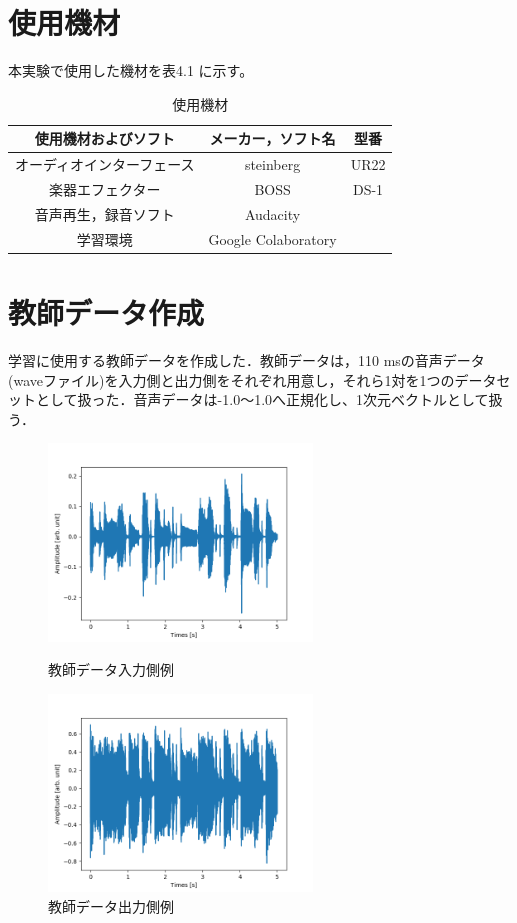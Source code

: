 \documentclass{jreport}		%
\begin{document}
\section{使用機材}
本実験で使用した機材を表4.1 に示す。
\begin{table}[h]
  \begin{center}
  \caption{使用機材}
  \begin{tabular}{c|cc} \hline
使用機材およびソフト&メーカー，ソフト名&型番 \\ \hline
    オーディオインターフェース&steinberg&UR22 \\
    楽器エフェクター&BOSS&DS-1\\
    音声再生，録音ソフト&Audacity& \\
    学習環境&Google Colaboratory& \\ \hline
  \end{tabular}
 \end{center}
\end{table}

\section{教師データ作成}
学習に使用する教師データを作成した．教師データは，110 msの音声データ(waveファイル)を入力側と出力側をそれぞれ用意し，それら1対を1つのデータセットとして扱った．音声データは-1.0～1.0へ正規化し、1次元ベクトルとして扱う．
\begin{figure}[htbp]
 \begin{minipage}{0.5\hsize}
 \begin{center}
  \includegraphics[width=70mm]{train_x0.png}
 \end{center}
 \caption{教師データ入力側例}
 \label{fig:one}
 \end{minipage}
 \begin{minipage}{0.5\hsize}
 \begin{center}
  \includegraphics[width=70mm]{train_y0.png}
 \end{center}
 \caption{教師データ出力側例}
 \label{fig:two}
 \end{minipage}
\end{figure}
\end{document}
